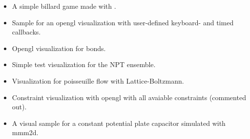 \documentclass[
paper=a4,                       %
fontsize=11pt,                  %
twoside,                        %
footsepline,                    %
headsepline,                    %
headinclude=false,              %
footinclude=false,              %
pagesize,                       %
]{scrartcl}
\begin{document}
\begin{itemize}

\item {} A simple billard game made with \es.

\item {} Sample for an opengl visualization with user-defined keyboard- and timed callbacks.

\item {} Opengl visualization for bonds.

\item {} Simple test visualization for the NPT ensemble.

\item {} Visualization for poisseuille flow with Lattice-Boltzmann.

\item {} Constraint visualization with opengl with all avaiable constraints (commented out).

\item {} A visual sample for a constant potential plate capacitor simulated with mmm2d.

\end{itemize}
\end{document}
